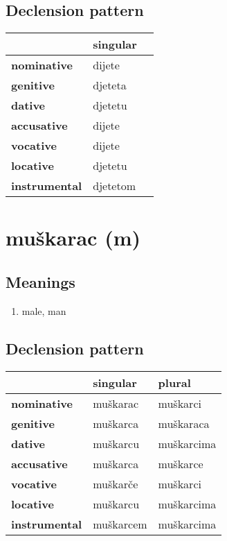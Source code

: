 \subsection*{Declension pattern}
\begin{tabularx}{\linewidth}{Xll}
\toprule
{} &  singular \\
\midrule
\textbf{nominative  } &    dijete \\
\textbf{genitive    } &   djeteta \\
\textbf{dative      } &   djetetu \\
\textbf{accusative  } &    dijete \\
\textbf{vocative    } &    dijete \\
\textbf{locative    } &   djetetu \\
\textbf{instrumental} &  djetetom \\
\bottomrule
\end{tabularx}

\filbreak
\section{muškarac (m)}
\subsection*{Meanings}
\begin{enumerate}
\item male, man
\end{enumerate}
\subsection*{Declension pattern}
\begin{tabularx}{\linewidth}{Xll}
\toprule
{} &   singular &      plural \\
\midrule
\textbf{nominative  } &   muškarac &    muškarci \\
\textbf{genitive    } &   muškarca &   muškaraca \\
\textbf{dative      } &   muškarcu &  muškarcima \\
\textbf{accusative  } &   muškarca &    muškarce \\
\textbf{vocative    } &   muškarče &    muškarci \\
\textbf{locative    } &   muškarcu &  muškarcima \\
\textbf{instrumental} &  muškarcem &  muškarcima \\
\bottomrule
\end{tabularx}

